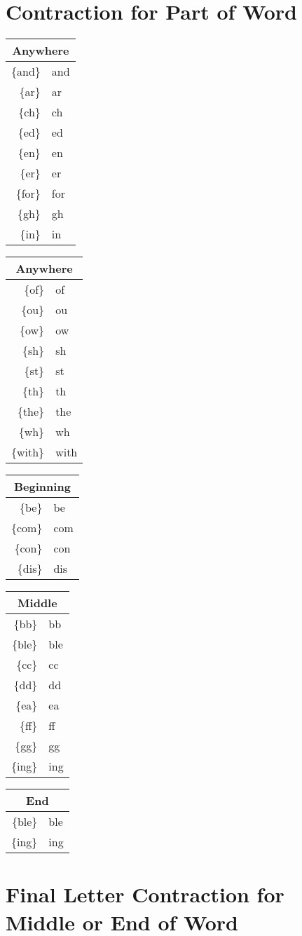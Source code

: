 \documentclass[draft]{article}
\newcommand{\mytablewith}[2]{%
    \enskip\begin{tabular}[t]{r|l} 
    \multicolumn{2}{c}{#1} \\
    \hline #2 \hline
    \end{tabular}\enskip}
\begin{document}
\section{Contraction for Part of Word}

\begin{center}
\mytablewith{Anywhere}{
\{and\}&and \\
\{ar\}&ar \\
\{ch\}&ch \\
\{ed\}&ed \\
\{en\}&en \\
\{er\}&er \\
\{for\}&for \\
\{gh\}&gh \\
\{in\}&in \\
}
\mytablewith{Anywhere}{
\{of\}&of \\
\{ou\}&ou \\
\{ow\}&ow \\
\{sh\}&sh \\
\{st\}&st \\
\{th\}&th \\
\{the\}&the \\
\{wh\}&wh \\
\{with\}&with \\
}
\mytablewith{Beginning}{
\{be\}&be \\
\{com\}&com \\
\{con\}&con \\
\{dis\}&dis \\
}
\mytablewith{Middle}{
\{bb\}&bb \\
\{ble\}&ble \\
\{cc\}&cc \\
\{dd\}&dd \\
\{ea\}&ea \\
\{ff\}&ff \\
\{gg\}&gg \\
\{ing\}&ing \\
}
\mytablewith{End}{
\{ble\}&ble \\
\{ing\}&ing \\
}
\end{center}


\section{Final Letter Contraction for Middle or End of Word}
\end{document}
